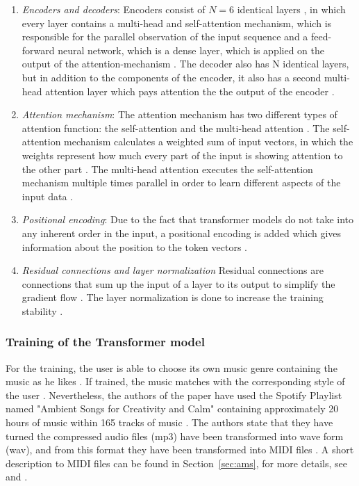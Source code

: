 \begin{enumerate}[label=\alph*)]
    \item \emph{Encoders and decoders}:
    Encoders consist of \( N = 6 \) identical layers , in which every layer contains
    a multi-head and self-attention mechanism, which is responsible for the parallel
    observation of the input sequence and a feed-forward neural network, which is a 
    dense layer, which is applied on the output of the attention-mechanism \cite{vaswani2017transformer}. The decoder also has N identical layers, but in addition
    to the components of the encoder, it also has a second multi-head attention layer which
    pays attention the the output of the encoder \cite{vaswani2017transformer}.
    \item \emph{Attention mechanism}:
    The attention mechanism has two different types of attention function: the self-attention
    and the multi-head attention \cite{vaswani2017transformer}.
    The self-attention mechanism calculates a weighted sum of input vectors, in which
    the weights represent how much every part of the input is showing attention to the
    other part \cite{vaswani2017transformer}.
    The multi-head attention executes the self-attention mechanism multiple times parallel
    in order to learn different aspects of the input data \cite{vaswani2017transformer}.
    \item \emph{Positional encoding}:
    Due to the fact that transformer models do not take into any inherent order in the
    input, a positional encoding is added which gives information about the
    position to the token vectors \cite{vaswani2017transformer}.
    \item \emph{Residual connections and layer normalization}
    Residual connections are connections that sum up the input of a layer to its output
    to simplify the gradient flow \cite{vaswani2017transformer}. The layer normalization
    is done to increase the training stability \cite{vaswani2017transformer}.
\end{enumerate}

\subsubsection{Training of the Transformer model}

For the training, the user is able to choose its own music genre containing 
the music as he likes \cite{amaral2022adaptive}. If trained, the
music matches with the corresponding style of the user \cite{amaral2022adaptive}.
Nevertheless, the authors of the paper have used the Spotify Playlist 
named "Ambient Songs for Creativity and Calm" \cite{spotify2022ambient} 
containing approximately 20 hours of music within 
165 tracks of music \cite{amaral2022adaptive}.
The authors state that they have turned the compressed audio files (mp3)
have been transformed into wave form (wav), and from this format 
they have been transformed into MIDI files \cite{amaral2022adaptive}.
A short description to MIDI files can be found in Section~\ref{sec:ams}, 
for more details, see \cite{midi_explanation} and \cite{midi_general}.

